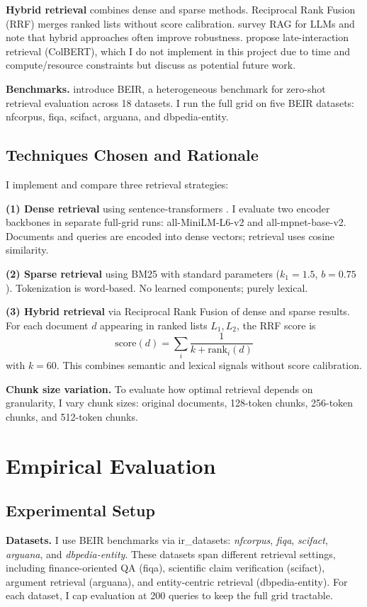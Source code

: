 \documentclass[twoside, 11pt]{article}
\begin{document}
\textbf{Hybrid retrieval} combines dense and sparse methods. Reciprocal Rank Fusion (RRF) merges ranked lists without score calibration. \citet{gao2022rag} survey RAG for LLMs and note that hybrid approaches often improve robustness. \citet{khattab2020colbert} propose late-interaction retrieval (ColBERT), which I do not implement in this project due to time and compute/resource constraints but discuss as potential future work.

\textbf{Benchmarks.} \citet{thakur2021beir} introduce BEIR, a heterogeneous benchmark for zero-shot retrieval evaluation across 18 datasets. I run the full grid on five BEIR datasets: nfcorpus, fiqa, scifact, arguana, and dbpedia-entity.

\subsection{Techniques Chosen and Rationale}
I implement and compare three retrieval strategies:

\textbf{(1) Dense retrieval} using sentence-transformers \citep{reimers2019sentencebert}. I evaluate two encoder backbones in separate full-grid runs: all-MiniLM-L6-v2 and all-mpnet-base-v2. Documents and queries are encoded into dense vectors; retrieval uses cosine similarity.

\textbf{(2) Sparse retrieval} using BM25 with standard parameters ($k_1 = 1.5$, $b = 0.75$). Tokenization is word-based. No learned components; purely lexical.

\textbf{(3) Hybrid retrieval} via Reciprocal Rank Fusion of dense and sparse results. For each document $d$ appearing in ranked lists $L_1, L_2$, the RRF score is
$$
\text{score}(d) = \sum_{i} \frac{1}{k + \text{rank}_i(d)}
$$
with $k = 60$. This combines semantic and lexical signals without score calibration.

\textbf{Chunk size variation.} To evaluate how optimal retrieval depends on granularity, I vary chunk sizes: original documents, 128-token chunks, 256-token chunks, and 512-token chunks.

\section{Empirical Evaluation}
\subsection{Experimental Setup}
\textbf{Datasets.} I use BEIR benchmarks via ir\_datasets: \textit{nfcorpus}, \textit{fiqa}, \textit{scifact}, \textit{arguana}, and \textit{dbpedia-entity}. These datasets span different retrieval settings, including finance-oriented QA (fiqa), scientific claim verification (scifact), argument retrieval (arguana), and entity-centric retrieval (dbpedia-entity). For each dataset, I cap evaluation at 200 queries to keep the full grid tractable.
\end{document}
